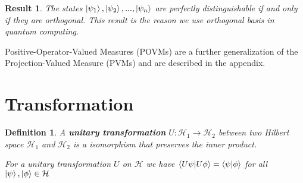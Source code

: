 \documentclass[12pt,twoside,fleqn]{report}
\theoremstyle{thmstyle}
\newtheorem{defn}{Definition}[chapter]
\newtheorem{result}{Result}[chapter]
\begin{document}
\begin{result}
            The states $\ket{\psi_1}, \ket{\psi_2}, ..., \ket{\psi_n}$ are perfectly distinguishable if and only if they are orthogonal. This result is the reason we use orthogonal basis in quantum computing.
\end{result}

Positive-Operator-Valued Measures (POVMs) are a further generalization of the Projection-Valued Measure (PVMs) and are described in the appendix. 

\section{Transformation}

\begin{comment}
    * Unitary transformation
    * Unitary matrix and properties
    * Every transformation is unitary
    * No cloning principle, Rieffel Polak P73
    * A measurement cannot be a transformation
\end{comment}

\begin{defn}
    A \textbf{unitary transformation} $U: \mathcal{H}_1 \to \mathcal{H}_2$ between two Hilbert space $\mathcal{H}_1$ and $\mathcal{H}_2$ is a isomorphism that preserves the inner product.

    For a unitary transformation $U$ on $\mathcal{H}$ we have
    $\braket{U \psi | U \phi } = \braket{\psi | \phi }$ for all $\ket{\psi}, \ket{\phi} \in \mathcal{H}$

\end{defn}
\end{document}
